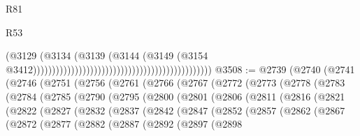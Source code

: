 \begin{lexlean}{R81}
\begin{lexlean}{R53}
\begin{coremodule}
{{{{{{{{{{{{{{{{{{{{{{{{{{{{{{{{{{{{{{{{{{{{{{{{{{{{{{{{{{{{{{{{{{{{{{{{{{{{{{{{{{{{{{{{{{{{{{{{{{{{{{{{{{{{{{{{                                                                                      (@3129
                                                                                        (@3134
                                                                                          (@3139
                                                                                            (@3144
                                                                                              (@3149
                                                                                                (@3154
                                                                                                  @3412)))))))))))))))))))))))))))))))))))))))))))))))
@3508 := @2739
    (@2740
      (@2741
        (@2746
          (@2751
            (@2756
              (@2761
                (@2766
                  (@2767
                    (@2772
                      (@2773
                        (@2778
                          (@2783
                            (@2784
                              (@2785
                                (@2790
                                  (@2795
                                    (@2800
                                      (@2801
                                        (@2806
                                          (@2811
                                            (@2816
                                              (@2821
                                                (@2822
                                                  (@2827
                                                    (@2832
                                                      (@2837
                                                        (@2842
                                                          (@2847
                                                            (@2852
                                                              (@2857
                                                                (@2862
                                                                  (@2867
                                                                    (@2872
                                                                      (@2877
                                                                        (@2882
                                                                          (@2887
                                                                            (@2892
                                                                              (@2897
                                                                                (@2898
}}}}}}}}}}}}}}}}}}}}}}}}}}}}}}}}}}}}}}}}}}}}}}}}}}}}}}}}}}}}}}}}}}}}}}}}}}}}}}}}}}}}}}}}}}}}}}}}}}}}}}}}}}}}}}}}
\end{coremodule}
\end{lexlean}
\end{lexlean}
